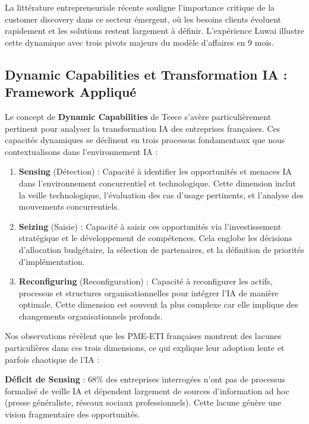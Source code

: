 La littérature entrepreneuriale récente \cite{blank2013lean, osterwalder2014value} souligne l'importance critique de la customer discovery dans ce secteur émergent, où les besoins clients évoluent rapidement et les solutions restent largement à définir. L'expérience Luwai illustre cette dynamique avec trois pivots majeurs du modèle d'affaires en 9 mois.

\subsection{Dynamic Capabilities et Transformation IA : Framework Appliqué}

Le concept de \textbf{Dynamic Capabilities} de Teece \cite{teece2007dynamic} s'avère particulièrement pertinent pour analyser la transformation IA des entreprises françaises. Ces capacités dynamiques se déclinent en trois processus fondamentaux que nous contextualisons dans l'environnement IA :

\begin{enumerate}
    \item \textbf{Sensing} (Détection) : Capacité à identifier les opportunités et menaces IA dans l'environnement concurrentiel et technologique. Cette dimension inclut la veille technologique, l'évaluation des cas d'usage pertinents, et l'analyse des mouvements concurrentiels.
    
    \item \textbf{Seizing} (Saisie) : Capacité à saisir ces opportunités via l'investissement stratégique et le développement de compétences. Cela englobe les décisions d'allocation budgétaire, la sélection de partenaires, et la définition de priorités d'implémentation.
    
    \item \textbf{Reconfiguring} (Reconfiguration) : Capacité à reconfigurer les actifs, processus et structures organisationnelles pour intégrer l'IA de manière optimale. Cette dimension est souvent la plus complexe car elle implique des changements organisationnels profonds.
\end{enumerate}

Nos observations révèlent que les PME-ETI françaises montrent des lacunes particulières dans ces trois dimensions, ce qui explique leur adoption lente et parfois chaotique de l'IA :

\textbf{Déficit de Sensing} : 68\% des entreprises interrogées n'ont pas de processus formalisé de veille IA et dépendent largement de sources d'information ad hoc (presse généraliste, réseaux sociaux professionnels). Cette lacune génère une vision fragmentaire des opportunités.

